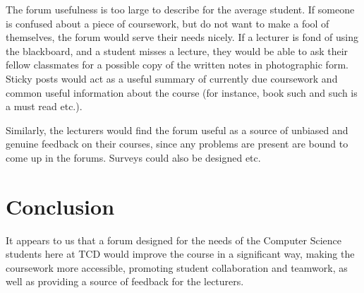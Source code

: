 \documentclass[a4paper, 12pt]{article}
\begin{document}
	The forum usefulness is too large to describe for the average student. 
	If someone is confused about a piece of coursework, but do not want to 
	make a fool of themselves, the forum would serve their needs nicely. 
	If a lecturer is fond of using the blackboard, and a student misses a 
	lecture, they would be able to ask their fellow classmates for a possible 
	copy of the written notes in photographic form. Sticky posts would act 
	as a useful summary of currently due coursework and common useful 
	information about the course (for instance, book such and such is a must read etc.).

	Similarly, the lecturers would find the forum useful as a source of unbiased and genuine 
	feedback on their courses, since any problems are present are bound to come 
	up in the forums. Surveys could also be designed etc.


	\section{Conclusion}

	It appears to us that a forum designed for the needs of 
	the Computer Science students here at TCD would improve 
	the course in a significant way, making the coursework more accessible, 
	promoting student collaboration and teamwork, as well as 
	providing a source of feedback for the lecturers.
\end{document}

